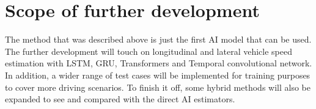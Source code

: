 \section{Scope of further development}

The method that was described above is just the first AI model that can be used. The further development will touch on longitudinal and lateral vehicle speed estimation with LSTM, GRU, Transformers and Temporal convolutional network. In addition, a wider range of test cases will be implemented for training purposes to cover more driving scenarios. To finish it off, some hybrid methods will also be expanded to see and compared with the direct AI estimators. 